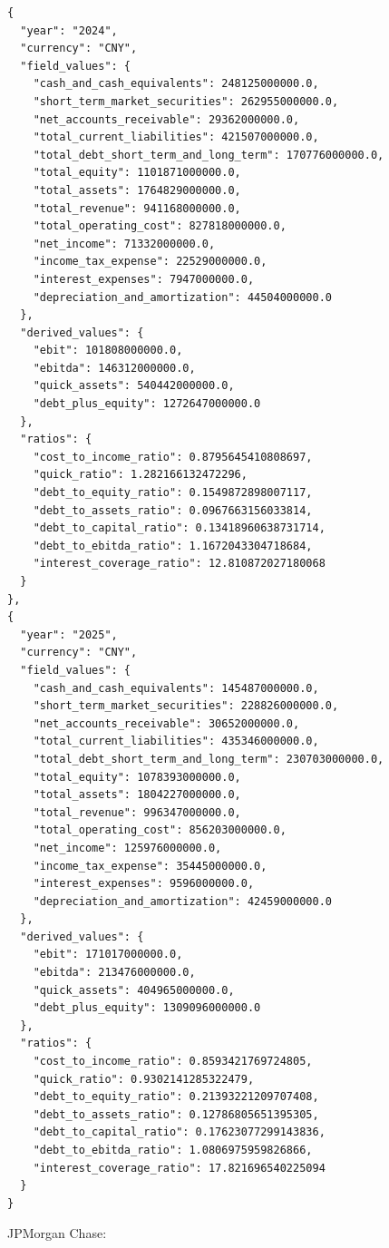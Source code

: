 \documentclass[12pt,a4paper]{article}
\begin{document}
\begin{lstlisting}[style=json, caption={Calculated financial ratios for Alibaba (FY\,2024--2025)}, label=lst:ratios_alibaba]
{
  "year": "2024",
  "currency": "CNY",
  "field_values": {
    "cash_and_cash_equivalents": 248125000000.0,
    "short_term_market_securities": 262955000000.0,
    "net_accounts_receivable": 29362000000.0,
    "total_current_liabilities": 421507000000.0,
    "total_debt_short_term_and_long_term": 170776000000.0,
    "total_equity": 1101871000000.0,
    "total_assets": 1764829000000.0,
    "total_revenue": 941168000000.0,
    "total_operating_cost": 827818000000.0,
    "net_income": 71332000000.0,
    "income_tax_expense": 22529000000.0,
    "interest_expenses": 7947000000.0,
    "depreciation_and_amortization": 44504000000.0
  },
  "derived_values": {
    "ebit": 101808000000.0,
    "ebitda": 146312000000.0,
    "quick_assets": 540442000000.0,
    "debt_plus_equity": 1272647000000.0
  },
  "ratios": {
    "cost_to_income_ratio": 0.8795645410808697,
    "quick_ratio": 1.282166132472296,
    "debt_to_equity_ratio": 0.1549872898007117,
    "debt_to_assets_ratio": 0.0967663156033814,
    "debt_to_capital_ratio": 0.13418960638731714,
    "debt_to_ebitda_ratio": 1.1672043304718684,
    "interest_coverage_ratio": 12.810872027180068
  }
},
{
  "year": "2025",
  "currency": "CNY",
  "field_values": {
    "cash_and_cash_equivalents": 145487000000.0,
    "short_term_market_securities": 228826000000.0,
    "net_accounts_receivable": 30652000000.0,
    "total_current_liabilities": 435346000000.0,
    "total_debt_short_term_and_long_term": 230703000000.0,
    "total_equity": 1078393000000.0,
    "total_assets": 1804227000000.0,
    "total_revenue": 996347000000.0,
    "total_operating_cost": 856203000000.0,
    "net_income": 125976000000.0,
    "income_tax_expense": 35445000000.0,
    "interest_expenses": 9596000000.0,
    "depreciation_and_amortization": 42459000000.0
  },
  "derived_values": {
    "ebit": 171017000000.0,
    "ebitda": 213476000000.0,
    "quick_assets": 404965000000.0,
    "debt_plus_equity": 1309096000000.0
  },
  "ratios": {
    "cost_to_income_ratio": 0.8593421769724805,
    "quick_ratio": 0.9302141285322479,
    "debt_to_equity_ratio": 0.21393221209707408,
    "debt_to_assets_ratio": 0.12786805651395305,
    "debt_to_capital_ratio": 0.17623077299143836,
    "debt_to_ebitda_ratio": 1.0806975959826866,
    "interest_coverage_ratio": 17.821696540225094
  }
}
\end{lstlisting}

JPMorgan Chase:
\end{document}
